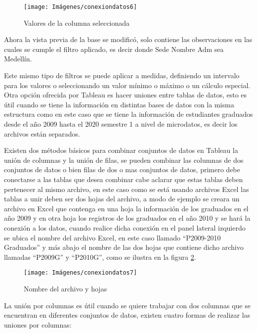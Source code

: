 \documentclass[
]{book}
\begin{document}
\begin{figure}

{\centering \texttt{[image: Imágenes/conexiondatos6]} 

}

\caption{Valores de la columna seleccionada}\label{fig:valoresdelcampo-fig}
\end{figure}

Ahora la vista previa de la base se modificó, solo contiene las observaciones en las cuales se cumple el filtro aplicado, es decir donde Sede Nombre Adm sea Medellín.

Este mismo tipo de filtros se puede aplicar a medidas, definiendo un intervalo para los valores o seleccionando un valor mínimo o máximo o un cálculo especial.
Otra opción ofrecida por Tableau es hacer uniones entre tablas de datos, esto es útil cuando se tiene la información en distintas bases de datos con la misma estructura como en este caso que se tiene la información de estudiantes graduados desde el año 2009 hasta el 2020 semestre 1 a nivel de microdatos, es decir los archivos están separados.

Existen dos métodos básicos para combinar conjuntos de datos en Tableau la unión de columnas y la unión de filas, se pueden combinar las columnas de dos conjuntos de datos o bien filas de dos o mas conjuntos de datos, primero debe conectarse a las tablas que desea combinar cabe aclarar que estas tablas deben pertenecer al mismo archivo, en este caso como se está usando archivos Excel las tablas a unir deben ser dos hojas del archivo, a modo de ejemplo se creara un archivo en Excel que contenga en una hoja la información de los graduados en el año 2009 y en otra hoja los registros de los graduados en el año 2010 y se hará la conexión a los datos, cuando realice dicha conexión en el panel lateral izquierdo se ubica el nombre del archivo Excel, en este caso llamado ``P2009-2010 Graduados'' y más abajo el nombre de las dos hojas que contiene dicho archivo llamadas ``P2009G'' y ``P2010G'', como se ilustra en la figura \ref{fig:hojas-fig}.

\begin{figure}

{\centering \texttt{[image: Imágenes/conexiondatos7]} 

}

\caption{Nombre del archivo y hojas}\label{fig:hojas-fig}
\end{figure}

La unión por columnas es útil cuando se quiere trabajar con dos columnas que se encuentran en diferentes conjuntos de datos, existen cuatro formas de realizar las uniones por columnas:
\end{document}

